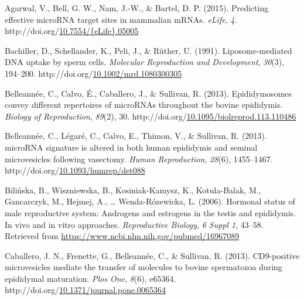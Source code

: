 \documentclass[12pt,twoside]{reedthesis}
\newlength{\cslhangindent}
\newenvironment{CSLReferences}[2] %
 {%
  \setlength{\parindent}{0pt}
  \ifodd #1 \everypar{\setlength{\hangindent}{\cslhangindent}}\ignorespaces\fi
  \ifnum #2 > 0
  \setlength{\parskip}{#2\baselineskip}
  \fi
 }%
 {}
\begin{document}

\noindent

\setlength{\parindent}{-0.20in}

\hypertarget{refs}{}
\begin{CSLReferences}{1}{0}
\leavevmode{}%
Agarwal, V., Bell, G. W., Nam, J.-W., \& Bartel, D. P. (2015). Predicting effective {microRNA} target sites in mammalian {mRNAs}. \emph{eLife}, \emph{4}. http://doi.org/\href{https://doi.org/10.7554/\%7BeLife\%7D.05005}{10.7554/\{eLife\}.05005}

\leavevmode{}%
Bachiller, D., Schellander, K., Peli, J., \& Rüther, U. (1991). Liposome-mediated {DNA} uptake by sperm cells. \emph{Molecular Reproduction and Development}, \emph{30}(3), 194--200. http://doi.org/\href{https://doi.org/10.1002/mrd.1080300305}{10.1002/mrd.1080300305}

\leavevmode{}%
Belleannée, C., Calvo, É., Caballero, J., \& Sullivan, R. (2013). Epididymosomes convey different repertoires of {microRNAs} throughout the bovine epididymis. \emph{Biology of Reproduction}, \emph{89}(2), 30. http://doi.org/\href{https://doi.org/10.1095/biolreprod.113.110486}{10.1095/biolreprod.113.110486}

\leavevmode{}%
Belleannée, C., Légaré, C., Calvo, E., Thimon, V., \& Sullivan, R. (2013). {microRNA} signature is altered in both human epididymis and seminal microvesicles following vasectomy. \emph{Human Reproduction}, \emph{28}(6), 1455--1467. http://doi.org/\href{https://doi.org/10.1093/humrep/det088}{10.1093/humrep/det088}

\leavevmode{}%
Bilińska, B., Wiszniewska, B., Kosiniak-Kamysz, K., Kotula-Balak, M., Gancarczyk, M., Hejmej, A., \ldots{} Wenda-Rózewicka, L. (2006). Hormonal status of male reproductive system: Androgens and estrogens in the testis and epididymis. In vivo and in vitro approaches. \emph{Reproductive Biology}, \emph{6 Suppl 1}, 43--58. Retrieved from \url{https://www.ncbi.nlm.nih.gov/pubmed/16967089}

\leavevmode{}%
Caballero, J. N., Frenette, G., Belleannée, C., \& Sullivan, R. (2013). {CD9}-positive microvesicles mediate the transfer of molecules to bovine spermatozoa during epididymal maturation. \emph{Plos One}, \emph{8}(6), e65364. http://doi.org/\href{https://doi.org/10.1371/journal.pone.0065364}{10.1371/journal.pone.0065364}


\end{CSLReferences}
\end{document}
